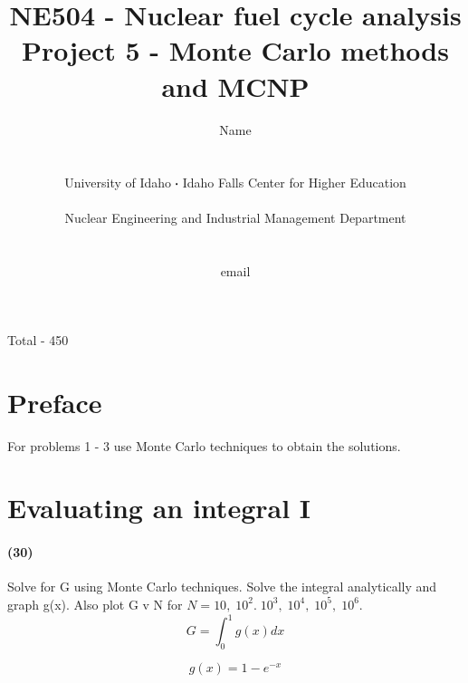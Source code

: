 \documentclass[11pt,a4paper]{article}
\newcommand*\sq{\mathbin{\vcenter{\hbox{\rule{.3ex}{.3ex}}}}} %
\begin{document}
\begin{titlepage}
    \title{
        NE504 - Nuclear fuel cycle analysis\\
        Project 5 - Monte Carlo methods and MCNP\\
    }
    \author{
        Name
        \\ \\ \\
        University of Idaho $\sq$ Idaho Falls Center for Higher Education
        \\ \\
        Nuclear Engineering and Industrial Management Department
        \\ \\ \\
        email 
    }
\clearpage %
\maketitle
\vspace*{\fill}
\begin{flushright}{
        Total - 450 
}
\end{flushright}
\thispagestyle{empty} %
\end{titlepage}

\printnoidxglossary

\newpage

\section*{Preface}
For problems 1 - 3 use Monte Carlo techniques to obtain the solutions.

\newpage

\section{Evaluating an integral I}
\paragraph*{(30)}
Solve for G using Monte Carlo techniques. Solve the integral analytically and graph g(x). Also plot G v N for $N = 10,\;10^2.\;10^3,\;10^4,\;10^5,\;10^6$.
\begin{equation}
    G = \int_0^1 g(x)dx 
\end{equation}

\begin{equation}
    g(x)=1-e^{-x}
\end{equation}
\end{document}
